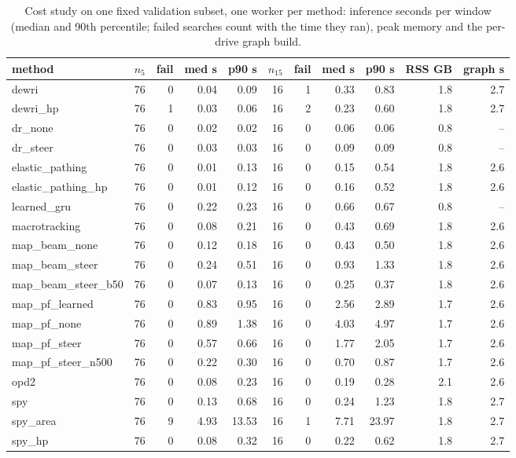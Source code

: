 \begin{table}[t]\centering\scriptsize\setlength{\tabcolsep}{3pt}
\caption{Cost study on one fixed validation subset, one worker per method: inference seconds per window (median and 90th percentile; failed searches count with the time they ran), peak memory and the per-drive graph build.}\label{tab:supp_cost}
\begin{tabular}{lrrrrrrrrrr}\toprule
method & $n_5$ & fail & med s & p90 s & $n_{15}$ & fail & med s & p90 s & RSS GB & graph s \\\midrule
dewri & 76 & 0 & 0.04 & 0.09 & 16 & 1 & 0.33 & 0.83 & 1.8 & 2.7 \\
dewri\_hp & 76 & 1 & 0.03 & 0.06 & 16 & 2 & 0.23 & 0.60 & 1.8 & 2.7 \\
dr\_none & 76 & 0 & 0.02 & 0.02 & 16 & 0 & 0.06 & 0.06 & 0.8 & -- \\
dr\_steer & 76 & 0 & 0.03 & 0.03 & 16 & 0 & 0.09 & 0.09 & 0.8 & -- \\
elastic\_pathing & 76 & 0 & 0.01 & 0.13 & 16 & 0 & 0.15 & 0.54 & 1.8 & 2.6 \\
elastic\_pathing\_hp & 76 & 0 & 0.01 & 0.12 & 16 & 0 & 0.16 & 0.52 & 1.8 & 2.6 \\
learned\_gru & 76 & 0 & 0.22 & 0.23 & 16 & 0 & 0.66 & 0.67 & 0.8 & -- \\
macrotracking & 76 & 0 & 0.08 & 0.21 & 16 & 0 & 0.43 & 0.69 & 1.8 & 2.6 \\
map\_beam\_none & 76 & 0 & 0.12 & 0.18 & 16 & 0 & 0.43 & 0.50 & 1.8 & 2.6 \\
map\_beam\_steer & 76 & 0 & 0.24 & 0.51 & 16 & 0 & 0.93 & 1.33 & 1.8 & 2.6 \\
map\_beam\_steer\_b50 & 76 & 0 & 0.07 & 0.13 & 16 & 0 & 0.25 & 0.37 & 1.8 & 2.6 \\
map\_pf\_learned & 76 & 0 & 0.83 & 0.95 & 16 & 0 & 2.56 & 2.89 & 1.7 & 2.6 \\
map\_pf\_none & 76 & 0 & 0.89 & 1.38 & 16 & 0 & 4.03 & 4.97 & 1.7 & 2.6 \\
map\_pf\_steer & 76 & 0 & 0.57 & 0.66 & 16 & 0 & 1.77 & 2.05 & 1.7 & 2.6 \\
map\_pf\_steer\_n500 & 76 & 0 & 0.22 & 0.30 & 16 & 0 & 0.70 & 0.87 & 1.7 & 2.6 \\
opd2 & 76 & 0 & 0.08 & 0.23 & 16 & 0 & 0.19 & 0.28 & 2.1 & 2.6 \\
spy & 76 & 0 & 0.13 & 0.68 & 16 & 0 & 0.24 & 1.23 & 1.8 & 2.7 \\
spy\_area & 76 & 9 & 4.93 & 13.53 & 16 & 1 & 7.71 & 23.97 & 1.8 & 2.7 \\
spy\_hp & 76 & 0 & 0.08 & 0.32 & 16 & 0 & 0.22 & 0.62 & 1.8 & 2.7 \\
\bottomrule\end{tabular}
\end{table}
